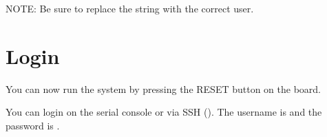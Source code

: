 NOTE: Be sure to replace the  string with the correct user.

\section{Login}

You can now run the system by pressing the RESET button on the board.

You can login on the serial console or via SSH (). The username is  and the password
is .
